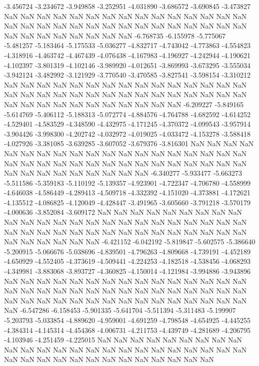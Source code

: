 -3.456724
-3.234672
-3.949858
-3.252951
-4.031890
-3.686572
-3.690845
-3.473827
NaN
NaN
NaN
NaN
NaN
NaN
NaN
NaN
NaN
NaN
NaN
NaN
NaN
NaN
NaN
NaN
NaN
NaN
NaN
NaN
NaN
NaN
NaN
NaN
NaN
NaN
NaN
NaN
NaN
NaN
NaN
NaN
NaN
NaN
NaN
NaN
NaN
NaN
-6.768735
-6.155978
-5.775067
-5.481257
-5.183464
-5.175533
-5.036277
-4.832717
-4.743042
-4.773863
-4.554823
-4.318916
-4.463742
-4.467439
-4.076438
-4.167983
-4.196927
-4.242944
-4.190621
-4.102397
-3.801319
-4.102146
-3.989920
-4.012651
-3.869993
-3.673295
-3.555034
-3.942124
-3.482992
-3.121929
-3.770540
-3.470585
-3.827541
-3.598154
-3.310212
NaN
NaN
NaN
NaN
NaN
NaN
NaN
NaN
NaN
NaN
NaN
NaN
NaN
NaN
NaN
NaN
NaN
NaN
NaN
NaN
NaN
NaN
NaN
NaN
NaN
NaN
NaN
NaN
NaN
NaN
NaN
NaN
NaN
NaN
NaN
NaN
NaN
NaN
NaN
NaN
NaN
-6.209227
-5.849165
-5.614769
-5.406112
-5.188313
-5.072774
-4.884576
-4.764788
-4.682592
-4.614252
-4.529401
-4.583529
-4.348590
-4.432975
-4.171245
-4.370372
-4.099543
-3.957914
-3.904426
-3.998300
-4.202742
-4.032972
-4.019025
-4.033472
-4.153278
-3.588418
-4.027926
-3.381085
-3.639285
-3.607052
-3.679376
-3.816301
NaN
NaN
NaN
NaN
NaN
NaN
NaN
NaN
NaN
NaN
NaN
NaN
NaN
NaN
NaN
NaN
NaN
NaN
NaN
NaN
NaN
NaN
NaN
NaN
NaN
NaN
NaN
NaN
NaN
NaN
NaN
NaN
NaN
NaN
NaN
NaN
NaN
NaN
NaN
NaN
NaN
NaN
NaN
-6.340277
-5.933477
-5.663273
-5.511586
-5.359183
-5.110192
-5.139357
-4.923901
-4.722347
-4.706780
-4.558999
-4.646038
-4.586449
-4.289413
-4.509718
-4.332392
-4.151020
-4.373881
-4.172621
-4.135512
-4.086825
-4.120049
-4.428447
-3.491965
-3.605660
-3.791218
-3.570179
-4.000636
-3.852084
-3.609172
NaN
NaN
NaN
NaN
NaN
NaN
NaN
NaN
NaN
NaN
NaN
NaN
NaN
NaN
NaN
NaN
NaN
NaN
NaN
NaN
NaN
NaN
NaN
NaN
NaN
NaN
NaN
NaN
NaN
NaN
NaN
NaN
NaN
NaN
NaN
NaN
NaN
NaN
NaN
NaN
NaN
NaN
NaN
NaN
NaN
-6.421152
-6.042192
-5.819847
-5.602575
-5.386640
-5.200915
-5.066676
-5.038696
-4.839501
-4.796263
-4.809668
-4.739191
-4.452189
-4.650929
-4.552405
-4.373619
-4.509441
-4.224253
-4.182518
-4.538456
-4.068293
-4.349981
-3.883068
-3.893727
-4.360825
-4.150014
-4.121984
-3.994886
-3.943896
NaN
NaN
NaN
NaN
NaN
NaN
NaN
NaN
NaN
NaN
NaN
NaN
NaN
NaN
NaN
NaN
NaN
NaN
NaN
NaN
NaN
NaN
NaN
NaN
NaN
NaN
NaN
NaN
NaN
NaN
NaN
NaN
NaN
NaN
NaN
NaN
NaN
NaN
NaN
NaN
NaN
NaN
NaN
NaN
NaN
NaN
-6.547286
-6.158453
-5.901335
-5.641704
-5.511394
-5.311483
-5.199907
-5.203793
-5.033854
-4.889620
-4.959001
-4.691259
-4.798548
-4.654925
-4.445255
-4.384314
-4.145314
-4.454368
-4.006731
-4.211753
-4.439749
-4.281689
-4.206795
-4.103946
-4.251459
-4.225015
NaN
NaN
NaN
NaN
NaN
NaN
NaN
NaN
NaN
NaN
NaN
NaN
NaN
NaN
NaN
NaN
NaN
NaN
NaN
NaN
NaN
NaN
NaN
NaN
NaN
NaN
NaN
NaN
NaN
NaN
NaN
NaN
NaN
NaN
NaN
NaN
NaN
